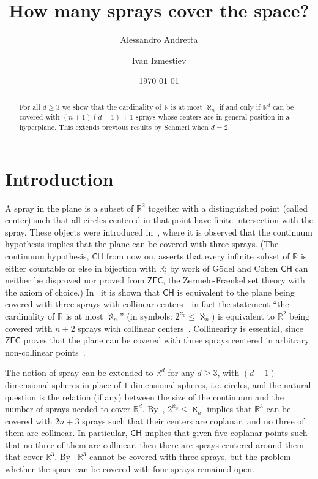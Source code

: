 \documentclass[12pt]{amsart}
\title{How many sprays cover the space?}
\author{Alessandro Andretta}
\author{Ivan Izmestiev}
\date{\today}
\newcommand{\CH}{{\mathsf{CH}}}	%
\newcommand{\R}{\mathbb{R}}	%
\newcommand{\ZFC}{\mathsf{ZFC}}		%
\theoremstyle{plain}
\theoremstyle{definition}
\theoremstyle{remark}
\begin{document}
\maketitle

\begin{abstract}
For all \( d \geq 3 \) we show that the cardinality of \( \R \) is at most \( \aleph_n \) if and only if \( \R^d \) can be covered with \( ( n + 1 ) ( d - 1 ) + 1 \) sprays whose centers are in general position in a hyperplane.
This extends previous results by Schmerl when \( d = 2 \).
\end{abstract}

\section{Introduction}
A spray in the plane is a subset of \( \R^2 \) together with a distinguished point (called center) such that all circles centered in that point have finite intersection with the spray.
These objects were introduced in~\cite{Schmerl:2003uq}, where it is observed that the continuum hypothesis implies that the plane can be covered with three sprays.
(The continuum hypothesis, \( \CH \) from now on, asserts that every infinite subset of \( \R \) is either countable or else in bijection with \( \R \); by work of Gödel and Cohen \( \CH \) can neither be disproved nor proved from \( \ZFC \), the Zermelo-Frænkel set theory with the axiom of choice.)
In~\cite{Vega:2009xy} it is shown that \( \CH \) is equivalent to the plane being covered with three sprays with collinear centers---in fact the statement ``the cardinality of \( \R \) is at most \( \aleph_n \)'' (in symbols: \( 2^{\aleph_0} \leq \aleph_n \)) is equivalent to \( \R^2 \) being covered with \( n + 2 \) sprays with collinear centers~\cite{Schmerl:2010nr}.
Collinearity is essential, since \( \ZFC \) proves that the plane can be covered with three sprays centered in arbitrary non-collinear points~\cite{Vega:2009xy,Schmerl:2010nr}.

The notion of spray can be extended to \( \R^d \) for any \( d \geq 3 \), with \( ( d - 1 ) \)-dimensional spheres in place of \( 1 \)-dimensional spheres, i.e. circles, and the natural question is the relation (if any) between the size of the continuum and the number of sprays needed to cover \( \R^d \).
By~\cite[Theorem 2]{Erdos:1994yq}, \( 2^{\aleph_0} \leq \aleph_n \) implies that \( \R^3 \) can be covered with \( 2 n + 3 \) sprays such that their centers are coplanar, and no three of them are collinear.
In particular, \( \CH \) implies that given five coplanar points such that no three of them are collinear, then there are sprays centered around them that cover \( \R^3 \).
By~\cite{Schmerl:2012aa} \( \R^3 \) cannot be covered with three sprays, but the problem whether the space can be covered with four sprays remained open.
\end{document}
